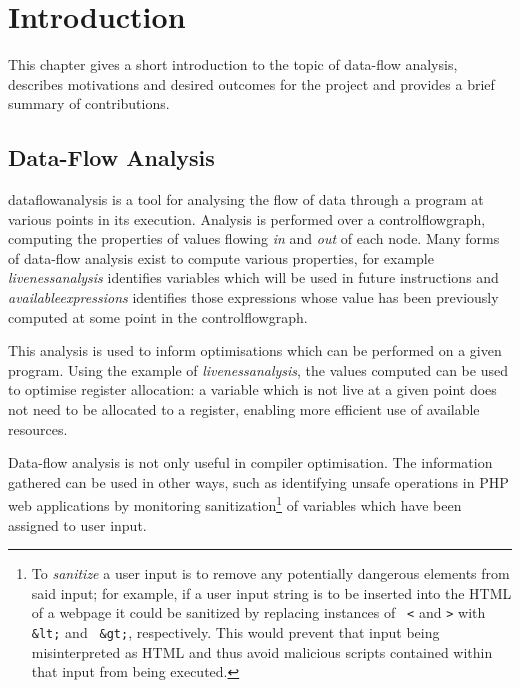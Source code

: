 \documentclass[bsc,twoside,singlespacing,parskip,logo,notimes,normalheadings]{infthesis}
\begin{document}
\tableofcontents

\chapter{Introduction}

This chapter gives a short introduction to the topic of data-flow
analysis, describes motivations and desired outcomes for the project
and provides a brief summary of contributions.


    \section{Data-Flow Analysis}
    \Gls{dataflowanalysis} is a tool for analysing the flow of data
    through a program at various points in its execution. Analysis is
    performed over a \gls{controlflowgraph}, computing the properties
    of values flowing {\em in} and {\em out} of each node. Many forms
    of data-flow analysis exist to compute various properties, for
    example {\em \gls{livenessanalysis}} identifies variables which
    will be used in future instructions and {\em
      \gls{availableexpression}s} identifies those expressions whose
    value has been previously computed at some point in the
    \gls{controlflowgraph}.
    
    This analysis is used to inform optimisations which can be
    performed on a given program. Using the example of {\em
      \gls{livenessanalysis}}, the values computed can be used to
    optimise register allocation: a variable which is not live at a
    given point does not need to be allocated to a register, enabling
    more efficient use of available resources.
    
    Data-flow analysis is not only useful in compiler
    optimisation. The information gathered can be used in other ways,
    such as identifying unsafe operations in PHP web
    applications\cite{TaintedFlow} by monitoring
    sanitization\footnote{To {\em sanitize} a user input is to remove
      any potentially dangerous elements from said input; for example,
      if a user input string is to be inserted into the HTML of a
      webpage it could be sanitized by replacing instances of {\tt
        \textless} and {\tt \textgreater} with {\tt \&lt;} and {\tt
        \&gt;}, respectively. This would prevent that input being
      misinterpreted as HTML and thus avoid malicious scripts
      contained within that input from being executed.} of variables
    which have been assigned to user input.
\end{document}
